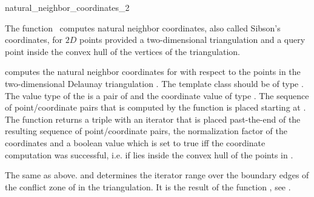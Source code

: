 
\begin{ccRefFunction}{natural_neighbor_coordinates_2}  %

\ccDefinition
  
The function \ccRefName\ computes natural neighbor coordinates, also
called Sibson's coordinates, for $2D$ points provided a two-dimensional
triangulation and a query point inside the convex hull of the vertices
of the triangulation.



 { computes the
  natural neighbor coordinates for  with respect to the points
  in the two-dimensional Delaunay triangulation .  The
  template class  should be of type
  .  The value type of the
   is a pair of  and the
  coordinate value of type . The sequence of
  point/coordinate pairs that is computed by the function is placed
  starting at . The function returns a triple with an
  iterator that is placed past-the-end of the resulting sequence of
  point/coordinate pairs, the normalization factor of the coordinates
  and a boolean value which is set to true iff the coordinate
  computation was successful, i.e. if  lies inside the
  convex hull of the points in .  }

 { The same as above.
   and  determines the iterator range
  over the boundary edges of the conflict zone of  in the
  triangulation. It is the result of the function
  , see .}


\end{ccRefFunction}
